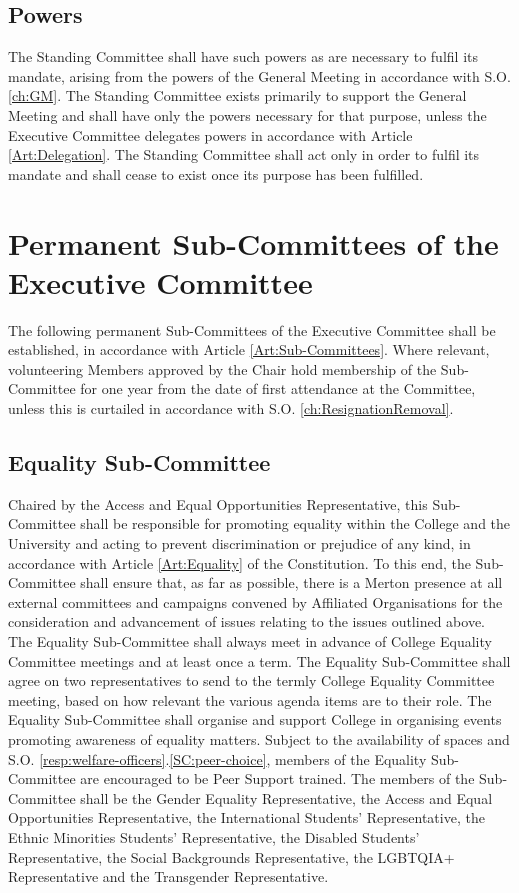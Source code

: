 \subsection{Powers}
\npara The Standing Committee shall have such powers as are necessary to fulfil its mandate, arising from the powers of the General Meeting in accordance with S.O. \ref{ch:GM}.
\npara The Standing Committee exists primarily to support the General Meeting and shall have only the powers necessary for that purpose, unless the Executive Committee delegates powers in accordance with Article \ref{Art:Delegation}.
\npara The Standing Committee shall act only in order to fulfil its mandate and shall cease to exist once its purpose has been fulfilled.
\section{Permanent Sub-Committees of the Executive Committee} \label{sec:PermanentSubCommittees}
\npara The following permanent Sub-Committees of the Executive Committee shall be established, in accordance with Article \ref{Art:Sub-Committees}.
\npara Where relevant, volunteering Members approved by the Chair hold membership of the Sub-Committee for one year from the date of first attendance at the Committee, unless this is curtailed in accordance with S.O. \ref{ch:ResignationRemoval}.
\subsection{Equality Sub-Committee} \label{ssec:equality-committee}
\npara Chaired by the Access and Equal Opportunities Representative, this Sub-Committee shall be responsible for promoting equality within the College and the University and acting to prevent discrimination or prejudice of any kind, in accordance with Article \ref{Art:Equality} of the Constitution. To this end, the Sub-Committee shall ensure that, as far as possible, there is a Merton presence at all external committees and campaigns convened by Affiliated Organisations for the consideration and advancement of issues relating to the issues outlined above.
\npara The Equality Sub-Committee shall always meet in advance of College Equality Committee meetings and at least once a term.
\npara The Equality Sub-Committee shall agree on two representatives to send to the termly College Equality Committee meeting, based on how relevant the various agenda items are to their role.
\npara The Equality Sub-Committee shall organise and support College in organising events promoting awareness of equality matters.
\npara Subject to the availability of spaces and S.O. \ref{resp:welfare-officers}.\ref{SC:peer-choice}, members of the Equality Sub-Committee are encouraged to be Peer Support trained.
\npara The members of the Sub-Committee shall be the Gender Equality Representative, the Access and Equal Opportunities Representative, the International Students’ Representative, the Ethnic Minorities Students' Representative, the Disabled Students’ Representative, the Social Backgrounds Representative, the LGBTQIA+ Representative and the Transgender Representative.
